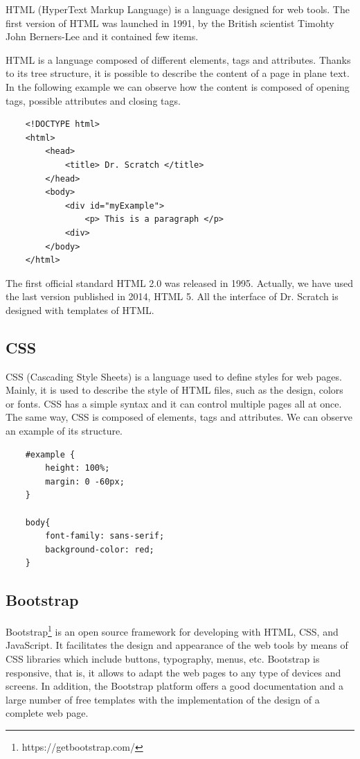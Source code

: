 HTML (HyperText Markup Language) is a language designed for web tools. The first version of HTML was launched in 1991, by the British scientist Timohty John Berners-Lee and it contained few items. 

HTML is a language composed of different elements, tags and attributes. Thanks to its tree structure, it is possible to describe the content of a page in plane text. In the following example we can observe how the content is composed of opening tags, possible attributes and closing tags. 

{\footnotesize
\begin{verbatim}
    <!DOCTYPE html>
    <html>
        <head>
            <title> Dr. Scratch </title>
        </head>
        <body>
            <div id="myExample">
                <p> This is a paragraph </p>
            <div>
        </body>
    </html>        
\end{verbatim}
}

The first official standard HTML 2.0 was released in 1995. Actually, we have used the last version published in 2014, HTML 5. All the interface of Dr. Scratch is designed with templates of HTML.


\subsection{CSS}
\label{subsec:css}

CSS (Cascading Style Sheets) is a language used to define styles for web pages. Mainly, it is used to describe the style of HTML files, such as the design, colors or fonts. CSS has a simple syntax and it can control multiple pages all at once. The same way, CSS is composed of elements, tags and attributes. We can observe an example of its structure.  

{\footnotesize
\begin{verbatim}
    #example {
        height: 100%;
        margin: 0 -60px;
    } 
    
    body{
        font-family: sans-serif;
        background-color: red;
    }
\end{verbatim}
}

\subsection{Bootstrap}
\label{subsec:bootstrap}

Bootstrap\footnote{https://getbootstrap.com/} is an open source framework for developing with HTML, CSS, and JavaScript. It facilitates the design and appearance of the web tools by means of CSS libraries which include buttons, typography, menus, etc. Bootstrap is responsive, that is, it allows to adapt the web pages to any type of devices and screens.
In addition, the Bootstrap platform offers a good documentation and a large number of free templates with the implementation of the design of a complete web page. 



